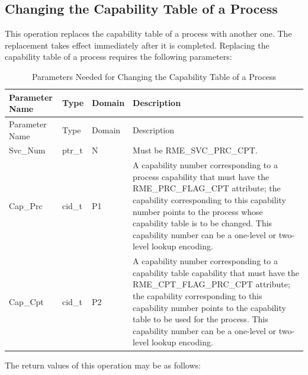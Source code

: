 \subsection{Changing the Capability Table of a Process}\label{subsec:4-change-process-capability-table}
\nopagebreak[4]

This operation replaces the capability table of a process with another one. The replacement takes effect immediately after it is completed. Replacing the capability table of a process requires the following parameters:

\begin{xltabular}{\textwidth}{@{}>{\hsize\raggedright\arraybackslash}X>{\hsize\raggedright\arraybackslash}X>{\hsize\raggedright\arraybackslash}X>{\hsize\raggedright\arraybackslash}X@{}}
\caption{Parameters Needed for Changing the Capability Table of a Process}\label{tab:4-14-change-process-capability-table-parameters}\\
\toprule
Parameter Name & Type & Domain & Description\tabularnewline
\endfirsthead
\toprule
Parameter Name & Type & Domain & Description\tabularnewline
\midrule
\endhead
\bottomrule
\endlastfoot
Svc\_Num & ptr\_t & N & Must be RME\_SVC\_PRC\_CPT.\tabularnewline
Cap\_Prc & cid\_t & P1 &
A capability number corresponding to a process capability that must have the RME\_PRC\_FLAG\_CPT attribute; the capability corresponding to this capability number points to the process whose capability table is to be changed. This capability number can be a one-level or two-level lookup encoding.\tabularnewline
Cap\_Cpt & cid\_t & P2 &
A capability number corresponding to a capability table capability that must have the RME\_CPT\_FLAG\_PRC\_CPT attribute; the capability corresponding to this capability number points to the capability table to be used for the process. This capability number can be a one-level or two-level lookup encoding.\tabularnewline
\end{xltabular}
\nopagebreak[4]

The return values of this operation may be as follows:

